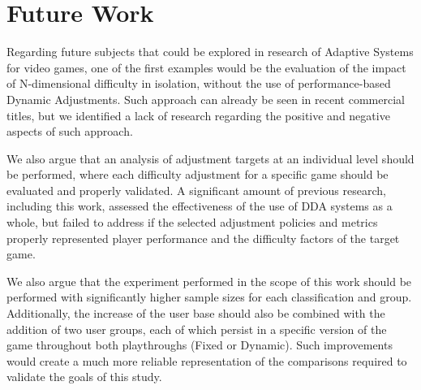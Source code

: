 \section{Future Work}

Regarding future subjects that could be explored in research of Adaptive Systems for video games, one of the first examples would be the evaluation of the impact of N-dimensional difficulty in isolation, without the use of performance-based Dynamic Adjustments. Such approach can already be seen in recent commercial titles, but we identified a lack of research regarding the positive and negative aspects of such approach.

We also argue that an analysis of adjustment targets at an individual level should be performed, where each difficulty adjustment for a specific game should be evaluated and properly validated. A significant amount of previous research, including this work, assessed the effectiveness of the use of DDA systems as a whole, but failed to address if the selected adjustment policies and metrics properly represented player performance and the difficulty factors of the target game.

We also argue that the experiment performed in the scope of this work should be performed with significantly higher sample sizes for each classification and group. Additionally, the increase of the user base should also be combined with the addition of two user groups, each of which persist in a specific version of the game throughout both playthroughs (Fixed or Dynamic). Such improvements would create a much more reliable representation of the comparisons required to validate the goals of this study.